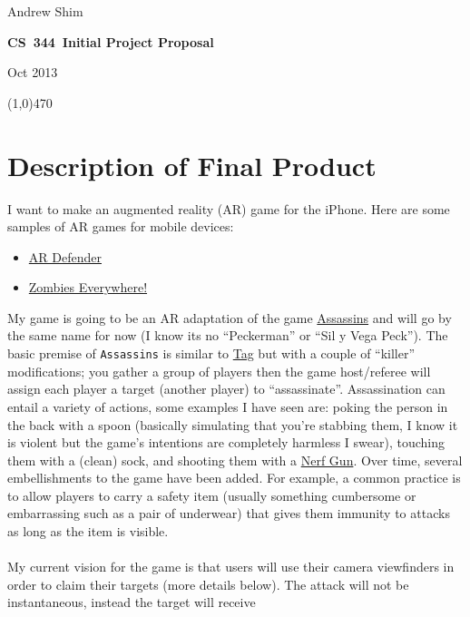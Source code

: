 \documentclass{article}
\newcommand\textline[4][t]{%
  \par\smallskip\noindent\parbox[#1]{.200\textwidth}{\raggedright#2}%
  \parbox[#1]{.600\textwidth}{\centering\Large\textbf{#3}}%
  \parbox[#1]{.200\textwidth}{\raggedleft#4}\par\smallskip%
  \line(1,0){470}
}
\newcommand{\hmwkTitle}{Initial Project Proposal} %
\newcommand{\hmwkClass}{CS\ 344} %
\newcommand{\hmwkAuthorName}{Andrew Shim} %
\newcommand{\dueDate}{17 Oct 2013}
\begin{document}
\thispagestyle{empty}


\textline[t]{\hmwkAuthorName}{\hmwkClass\ \hmwkTitle}{\dueDate}


\section{Description of Final Product}
I want to make an augmented reality (AR) game for the iPhone. Here are some samples
of AR games for mobile devices:
\begin{itemize}
  \item\href{http://www.youtube.com/watch?v=rB5xUStsUs4}{AR Defender}
  \item\href{http://www.youtube.com/watch?v=Ce1U_9DRcac}{Zombies Everywhere!}
\end{itemize}
My game is going to be an AR adaptation of the game 
\href{http://en.wikipedia.org/wiki/Assassin_(game)}{Assassins} and
will go by the same name for now (I know its no ``Peckerman'' or 
``Sil y Vega Peck''). The basic premise of \texttt{Assassins} is similar to 
\href{http://en.wikipedia.org/wiki/Tag_(game)}{Tag}
but with a couple of ``killer'' modifications; you gather a group
of players then the game host/referee will assign each player a target
(another player) to ``assassinate''. Assassination can entail a variety of
actions, some examples I have seen are: poking the person in the back with a spoon 
(basically simulating that you're stabbing them, I know it is violent but the 
game's intentions are completely harmless I swear), 
touching them with a (clean) sock, and shooting them with a 
\href{http://www.hasbro.com/nerf/en_us/}{Nerf Gun}. Over time, several 
embellishments to the game have been added. For example, a common practice
is to allow players to carry a safety item (usually something 
cumbersome or embarrassing such as a pair of underwear) that gives them
immunity to attacks as long as the item is visible.
\\\\
My current vision for the game is that users will use their camera 
viewfinders in order to claim their targets (more details below). 
The attack will not be instantaneous, instead the target will receive
\end{document}
